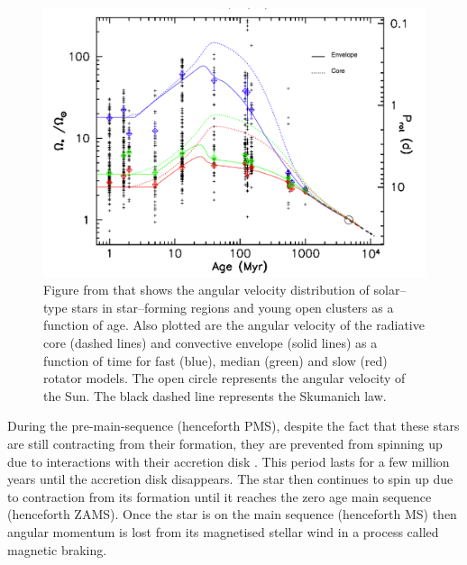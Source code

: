 \begin{figure}[h]
    \centering
    \includegraphics[scale=0.4]{Figures/1-Introduction/gallet&_bouvier_figure_2013.pdf}
    \caption[Angular velocity distribution as a function of age]{Figure from \citet{Gallet_Bouvier_2013} that shows the angular velocity distribution of solar--type stars in star--forming regions and young open clusters as a function of age. Also plotted are the angular velocity of the radiative core (dashed lines) and convective envelope (solid lines) as a function of time for fast (blue), median (green) and slow (red) rotator models. The open circle represents the angular velocity of the Sun. The black dashed line represents the Skumanich law.}
    \label{fig:gallet_&_bouvier_2013_fig}
\end{figure}

During the pre-main-sequence (henceforth PMS), despite the fact that these stars are still contracting from their formation, they are prevented from spinning up due to interactions with their accretion disk \citep{Edwards_etal_1993,Rebull_etal_2004}. This period lasts for a few million years until the accretion disk disappears. The star then continues to spin up due to contraction from its formation until it reaches the zero age main sequence (henceforth ZAMS). Once the star is on the main sequence (henceforth MS) then angular momentum is lost from its magnetised stellar wind in a process called magnetic braking.

